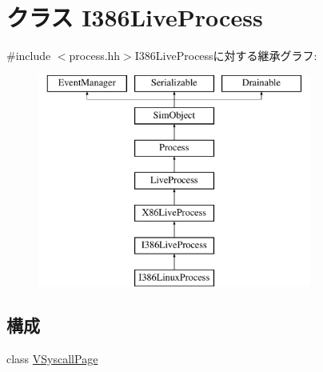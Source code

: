 \hypertarget{classX86ISA_1_1I386LiveProcess}{
\section{クラス I386LiveProcess}
\label{classX86ISA_1_1I386LiveProcess}
}


{\ttfamily \#include $<$process.hh$>$}I386LiveProcessに対する継承グラフ:\begin{figure}[H]
\begin{center}
\leavevmode
\includegraphics[height=7cm]{classX86ISA_1_1I386LiveProcess}
\end{center}
\end{figure}
\subsection*{構成}
\begin{DoxyCompactItemize}
\item 
class \hyperlink{classX86ISA_1_1I386LiveProcess_1_1VSyscallPage}{VSyscallPage}
\end{DoxyCompactItemize}
